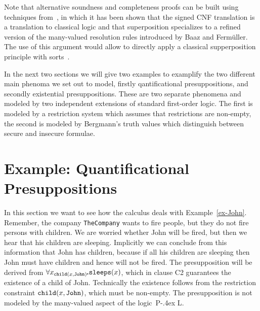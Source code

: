 \documentclass{\filespath jancl}
\newcommand\COMP{{\sf TheCompany}}
\def\sdot{\rule{.3ex}{.3ex}\hspace{-0.4ex}\;} %
\def\presuppl{{\cal P\kern-.4ex L}}
\newcommand{\all}[3]{\forall {#1}_{#2}\sdot #3}
\def\sf{\tt}
\begin{document}
Note that alternative soundness and completeness proofs can be built
using techniques from~\cite{GS00}, in which it has been shown that the
signed CNF translation is a translation to classical logic and that
superposition specializes to a refined version of the many-valued
resolution rules introduced by Baaz and Ferm\"uller. The use of this
argument would allow to directly apply a classical supperposition
principle with sorts~\cite{Weidenbach96}.

In the next two sections we will give two examples to examplify the two different main
phenoma we set out to model, firstly qantificational presuppositions, and secondly
existential presuppositions. These are two separate phenomena and modeled by two
independent extensions of standard first-order logic. The first is modeled by a restriction
system which assumes that restrictions are non-empty, the second is modeled by Bergmann's truth
values which distinguish between secure and insecure formulae.
 
\section{Example: Quantificational Presuppositions }
\label{sec:example}

In this section we want to see how the calculus deals with
Example~\ref{ex-John}. Remember, the company {\COMP} wants to fire
people, but they do not fire persons with children. We are worried
whether John will be fired, but then we hear that his children are
sleeping. Implicitly we can conclude from this information that John
has children, because if all his children are sleeping then John must
have children and hence will not be fired. The presupposition will be
derived from $\all{x}{{\sf child}(x,{\sf John})}{{\sf sleeps}(x)}$,
which in clause C2 guarantees the existence of a child of
John. Technically the existence follows from the restriction
constraint ${\sf child}(x,{\sf John})$, which must be non-empty. The
presupposition is not modeled by the many-valued aspect of the
logic~\presuppl.
\end{document}

